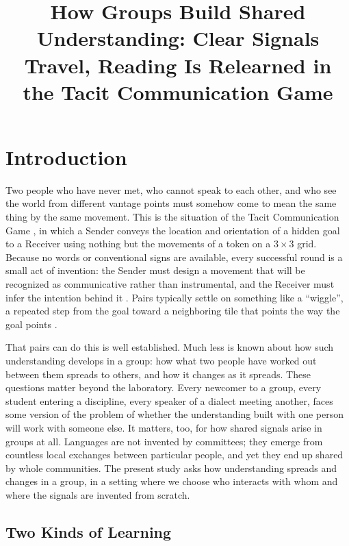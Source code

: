 \documentclass[stu,11pt,floatsintext,donotrepeattitle]{apa7}
\title{How Groups Build Shared Understanding: Clear Signals Travel, Reading Is Relearned in the Tacit Communication Game}
\begin{document}
\maketitle

\section{Introduction}

Two people who have never met, who cannot speak to each other, and who see the world from different vantage points must somehow come to mean the same thing by the same movement. This is the situation of the Tacit Communication Game \parencite[TCG;][]{deruiter2010}, in which a Sender conveys the location and orientation of a hidden goal to a Receiver using nothing but the movements of a token on a $3 \times 3$ grid. Because no words or conventional signs are available, every successful round is a small act of invention: the Sender must design a movement that will be recognized as communicative rather than instrumental, and the Receiver must infer the intention behind it \parencite{stolk2016}. Pairs typically settle on something like a \enquote{wiggle}, a repeated step from the goal toward a neighboring tile that points the way the goal points \parencite{blokpoel2012}.

That pairs can do this is well established. Much less is known about how such understanding develops in a group: how what two people have worked out between them spreads to others, and how it changes as it spreads. These questions matter beyond the laboratory. Every newcomer to a group, every student entering a discipline, every speaker of a dialect meeting another, faces some version of the problem of whether the understanding built with one person will work with someone else. It matters, too, for how shared signals arise in groups at all. Languages are not invented by committees; they emerge from countless local exchanges between particular people, and yet they end up shared by whole communities. The present study asks how understanding spreads and changes in a group, in a setting where we choose who interacts with whom and where the signals are invented from scratch.

\subsection{Two Kinds of Learning}
\end{document}
